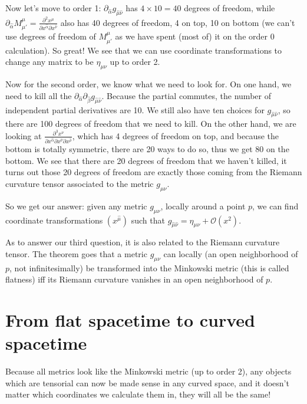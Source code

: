 \documentclass[10pt]{article}
\newcommand{\xm}{x^\mu}
\newcommand{\xn}{x^\nu}
\newcommand{\gmn}{g_{\mu \nu}}
\newcommand{\gmnhat}{g_{\hat{\mu} \hat{\nu}}}
\newcommand{\emn}{\eta_{\mu \nu}}
\begin{document}
Now let's move to order 1: $\partial_{\hat{\alpha}} \gmnhat$ has $4 \times 10 = 40$ degrees of freedom, while $\partial_{\hat{\alpha}} M^{\mu}_{\mu'} = \frac{\partial^2 \xm}{\partial x^{\hat{\alpha}} \partial x^{\hat{\nu}}}$ also has 40 degrees of freedom, 4 on top, 10 on bottom (we can't use degrees of freedom of $M^{\mu}_{\mu'}$ as we have spent (most of) it on the order 0 calculation). So great! We see that we can use coordinate transformations to change any matrix to be $\emn$ up to order 2.

Now for the second order, we know what we need to look for. On one hand, we need to kill all the $\partial_{\hat{\alpha}} \partial_{\hat{\beta}} \gmnhat$. Because the partial commutes, the number of independent partial derivatives are 10. We still also have ten choices for $\gmnhat$, so there are 100 degrees of freedom that we need to kill. On the other hand, we are looking at 
$\frac{\partial^3 \xn}{\partial x^{\hat{\alpha}} \partial x^{\hat{\nu}} \partial x^{\hat{\rho}}}$, which has 4 degrees of freedom on top, and because the bottom is totally symmetric, there are 20 ways to do so, thus we get 80 on the bottom. We see that there are 20 degrees of freedom that we haven't killed, it turns out those 20 degrees of freedom are exactly those coming from the Riemann curvature tensor associated to the metric $\gmn$. 

So we get our answer: given any metric $\gmn$, locally around a point $p$, we can find coordinate transformations $(x^{\hat{\mu}})$ such that $\gmnhat = \emn + \mathcal{O}(x^2)$. 

As to answer our third question, it is also related to the Riemann curvature tensor. The theorem goes that a metric $\gmn$ can locally (an open neighborhood of $p$, not infinitesimally) be transformed into the Minkowski metric (this is called flatness) iff its Riemann curvature vanishes in an open neighborhood of $p$.

\section {From flat spacetime to curved spacetime}\label{sec:class_style}

Because all metrics look like the Minkowski metric (up to order 2), any objects which are tensorial can now be made sense in any curved space, and it doesn't matter which coordinates we calculate them in, they will all be the same!
\end{document}
